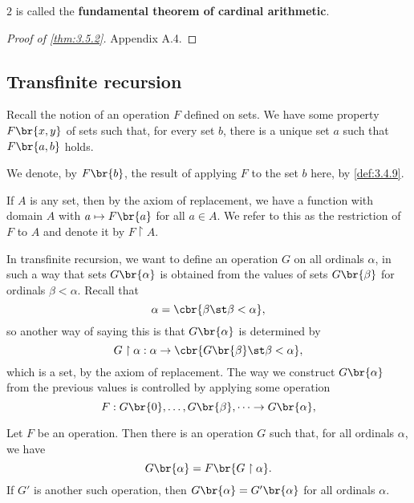 $ 2 $ is called the \textbf{fundamental theorem of cardinal arithmetic}.


\begin{proof}[Proof of \ref{thm:3.5.2}]
Appendix A.4.
\end{proof}

\pagebreak

\subsection{Transfinite recursion}

Recall the notion of an operation $ F $ defined on sets. We have some property $ F\br{x, y} $ of sets such that, for every set $ b $, there is a unique set $ a $ such that $ F\br{a, b} $ holds.

\begin{notation*}
We denote, by $ F\br{b} $, the result of applying $ F $ to the set $ b $ here, by \ref{def:3.4.9}.
\end{notation*}

\begin{note*}
If $ A $ is any set, then by the axiom of replacement, we have a function with domain $ A $ with $ a \mapsto F\br{a} $ for all $ a \in A $. We refer to this as
the restriction of $ F $ to $ A $ and denote it by $ F \upharpoonright A $.
\end{note*}

In transfinite recursion, we want to define an operation $ G $ on all ordinals $ \alpha $, in such a way that sets $ G\br{\alpha} $ is obtained from the values of sets $ G\br{\beta} $ for ordinals $ \beta < \alpha $. Recall that
$$ \alpha = \cbr{\beta \st \beta < \alpha}, $$
so another way of saying this is that $ G\br{\alpha} $ is determined by
$$ G \upharpoonright \alpha : \alpha \to \cbr{G\br{\beta} \st \beta < \alpha}, $$
which is a set, by the axiom of replacement.
The way we construct $ G\br{\alpha} $ from the previous values is controlled by applying some operation
$$ F : G\br{0}, \dots, G\br{\beta}, \dots \to G\br{\alpha}, $$

\begin{theorem}
\label{thm:3.6.1}
Let $ F $ be an operation. Then there is an operation $ G $ such that, for all ordinals $ \alpha $, we have
$$ G\br{\alpha} = F\br{G \upharpoonright \alpha}. $$
If $ G' $ is another such operation, then $ G\br{\alpha} = G'\br{\alpha} $ for all ordinals $ \alpha $.
\end{theorem}

